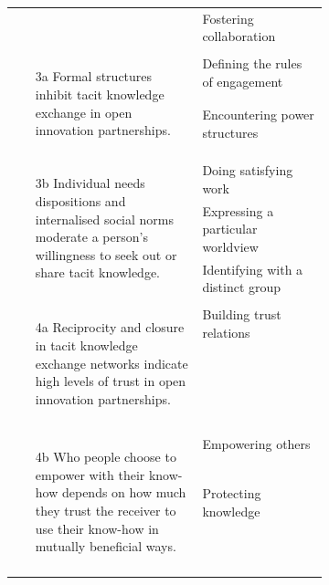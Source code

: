 \begin{table}
{\begin{tabular}{l p{0.4\linewidth}}
& Fostering collaboration \\ \\ 
\multirow{2}{*}{\begin{minipage}{0.7\linewidth}
\begin{enumerate}
\item[3a] Formal structures inhibit tacit knowledge exchange in open innovation partnerships.
\end{enumerate}
\end{minipage}} & Defining the rules of engagement \\
& Encountering power structures \\ \\
\multirow{3}{*}{\begin{minipage}{0.7\linewidth}
\begin{enumerate}
\item[3b] Individual needs dispositions and internalised social norms moderate a person's willingness to seek out or share tacit knowledge.
\end{enumerate}
\end{minipage}} & Doing satisfying work \\
& Expressing a particular worldview \\
& Identifying with a distinct group \\ \\
\multirow{1}{*}{\begin{minipage}{0.7\linewidth}
\begin{enumerate}
\item[4a] Reciprocity and closure in tacit knowledge exchange networks indicate high levels of trust in open innovation partnerships.
\end{enumerate}
\end{minipage}} & Building trust relations \\ \\  \\
\multirow{2}{*}{\begin{minipage}{0.7\linewidth}
\begin{enumerate}
\item[4b] Who people choose to empower with their know-how depends on how much they trust the receiver to use their know-how in mutually beneficial ways.
\end{enumerate} 
\end{minipage}}
& Empowering others \\
& Protecting knowledge \\  \\ \bottomrule
\end{tabular}
}
\end{table}

